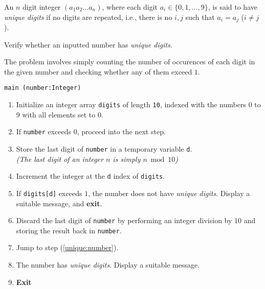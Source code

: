 

\problem An $n$ digit integer $(a_1a_2\dots a_n)$, where each digit $a_i \in \{0, 1, \dots, 9\}$,
is said to have {\em unique digits} if no digits are repeated, i.e., there is no $i, j$ such that $a_i = a_j$ ($i \neq j$).

Verify whether an inputted number has {\em unique digits}.

\solution The problem involves simply counting the number of occurences of each digit in the given number and checking whether any of them exceed $1$.

\algorithm
{\tt main (number:Integer)}
\begin{enumerate}
	\item	Initialize an integer array {\tt digits} of length {\tt 10}, indexed with the numbers $0$ to $9$ with all
			elements set to $0$.
	\item	If {\tt number} exceeds $0$, proceed into the next step.\label{unique:number}
	\item	Store the last digit of {\tt number} in a temporary variable {\tt d}.\\
			{\em (The last digit of an integer $n$ is simply $n \bmod 10$)}
	\item	Increment the integer at the {\tt d} index of {\tt digits}.
	\item	If {\tt digits[d]} exceeds $1$, the number does not have {\em unique digits}. Display a suitable
			message, and {\bf exit}.
	\item	Discard the last digit of {\tt number} by performing an integer division by $10$ and storing
			the result back in {\tt number}.
	\item	Jump to step (\ref{unique:number}).
	\item	The number has {\em unique digits}. Display a suitable message.
	\item	{\bf Exit}
\end{enumerate}

\sourcecode

